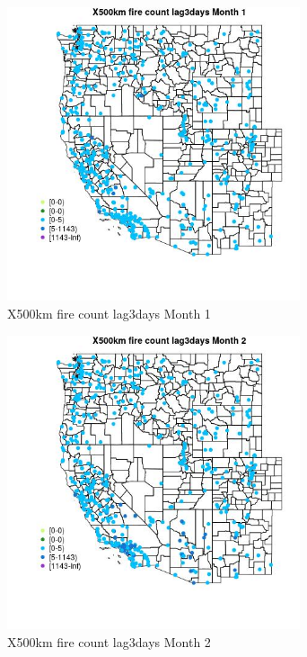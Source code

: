 \begin{figure} 
\centering  
\includegraphics[width=0.77\textwidth]{Code_Outputs/Report_ML_input_PM25_Step4_part_e_de_duplicated_aves_compiled_2019-05-14wNAs_MapObsMo1X500km_fire_count_lag3days.jpg} 
\caption{\label{fig:Report_ML_input_PM25_Step4_part_e_de_duplicated_aves_compiled_2019-05-14wNAsMapObsMo1X500km_fire_count_lag3days}X500km fire count lag3days Month 1} 
\end{figure} 
 

\begin{figure} 
\centering  
\includegraphics[width=0.77\textwidth]{Code_Outputs/Report_ML_input_PM25_Step4_part_e_de_duplicated_aves_compiled_2019-05-14wNAs_MapObsMo2X500km_fire_count_lag3days.jpg} 
\caption{\label{fig:Report_ML_input_PM25_Step4_part_e_de_duplicated_aves_compiled_2019-05-14wNAsMapObsMo2X500km_fire_count_lag3days}X500km fire count lag3days Month 2} 
\end{figure} 
 

